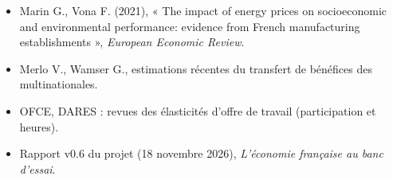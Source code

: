 \begin{itemize}
\item Marin G., Vona F. (2021), « The impact of energy prices on socioeconomic and environmental performance: evidence from French manufacturing establishments », \emph{European Economic Review}.
\item Merlo V., Wamser G., estimations récentes du transfert de bénéfices des multinationales.
\item OFCE, DARES : revues des élasticités d'offre de travail (participation et heures).
\item Rapport v0.6 du projet (18 novembre 2026), \emph{L'économie française au banc d'essai}.
\end{itemize}
